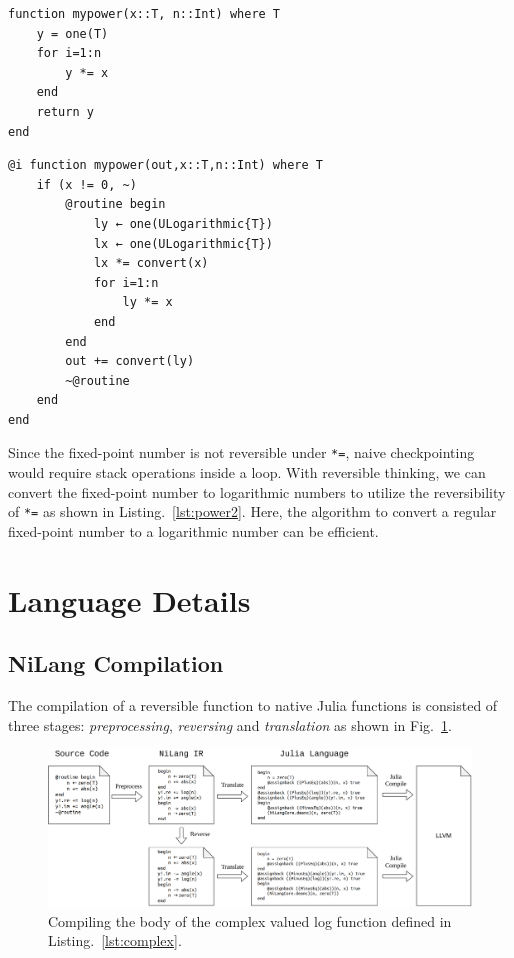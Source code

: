 \documentclass{article}
\newcommand{\<}{\langle}
\renewcommand{\>}{\rangle}
\renewcommand{\cite}[1]{{\citep{#1}}}
\newcommand{\Fig}[1]{Fig.~\ref{#1}}
\newcommand{\Lst}[1]{Listing.~\ref{#1}}
\theoremstyle{definition}\newtheorem{definition}{\textit{Definition}}
\begin{document}
\begin{minipage}{.45\columnwidth}
\begin{lstlisting}[mathescape=true,caption={A regular power function.},label={lst:power1}]
function mypower(x::T, n::Int) where T
    y = one(T)
    for i=1:n
        y *= x
    end
    return y
end
\end{lstlisting}
\end{minipage}\hfill
\begin{minipage}{.45\columnwidth}
\begin{lstlisting}[mathescape=true,caption={A reversible power function.},label={lst:power2}]
@i function mypower(out,x::T,n::Int) where T
    if (x != 0, ~)
        @routine begin
            ly ← one(ULogarithmic{T})
            lx ← one(ULogarithmic{T})
            lx *= convert(x)
            for i=1:n
                ly *= x
            end
        end
        out += convert(ly)
        ~@routine
    end
end
\end{lstlisting}
\end{minipage}

Since the fixed-point number is not reversible under \texttt{*=}, naive checkpointing would require stack operations inside a loop. With reversible thinking, we can convert the fixed-point number to logarithmic numbers to utilize the reversibility of \texttt{*=} as shown in \Lst{lst:power2}. Here, the algorithm to convert a regular fixed-point number to a logarithmic number can be efficient.~\cite{Turner2010}

\section{Language Details}\label{app:detail}
\subsection{NiLang Compilation}\label{app:compile}
The compilation of a reversible function to native Julia functions is consisted of three stages: \textit{preprocessing}, \textit{reversing} and \textit{translation} as shown in \Fig{fig:compiling}.

\begin{figure}
    \centerline{\includegraphics[width=0.95\columnwidth,trim={0cm 0cm 0cm 0cm},clip]{compiling_v2.pdf}}
    \caption{Compiling the body of the complex valued log function defined in \Lst{lst:complex}.}\label{fig:compiling}
\end{figure}
\end{document}
